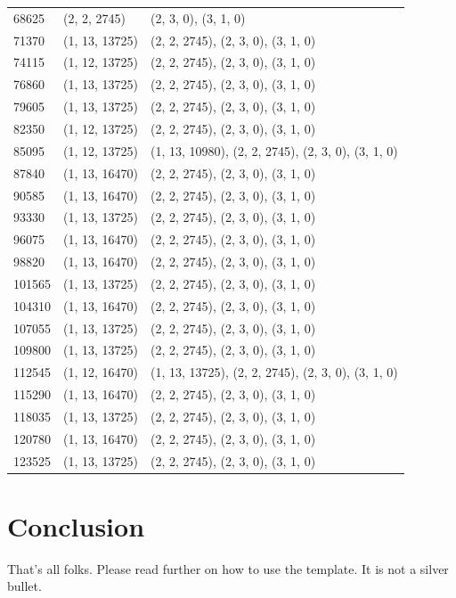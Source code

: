 \documentclass{utmthesis}
\begin{document}
\begin{center}
\begin{longtable}{|l|l|l|}
68625 & (2, 2, 2745) & (2, 3, 0), (3, 1, 0) \\
71370 & (1, 13, 13725) & (2, 2, 2745), (2, 3, 0), (3, 1, 0) \\
74115 & (1, 12, 13725) & (2, 2, 2745), (2, 3, 0), (3, 1, 0) \\
76860 & (1, 13, 13725) & (2, 2, 2745), (2, 3, 0), (3, 1, 0) \\
79605 & (1, 13, 13725) & (2, 2, 2745), (2, 3, 0), (3, 1, 0) \\
82350 & (1, 12, 13725) & (2, 2, 2745), (2, 3, 0), (3, 1, 0) \\
85095 & (1, 12, 13725) & (1, 13, 10980), (2, 2, 2745), (2, 3, 0), (3, 1, 0) \\
87840 & (1, 13, 16470) & (2, 2, 2745), (2, 3, 0), (3, 1, 0) \\
90585 & (1, 13, 16470) & (2, 2, 2745), (2, 3, 0), (3, 1, 0) \\
93330 & (1, 13, 13725) & (2, 2, 2745), (2, 3, 0), (3, 1, 0) \\
96075 & (1, 13, 16470) & (2, 2, 2745), (2, 3, 0), (3, 1, 0) \\
98820 & (1, 13, 16470) & (2, 2, 2745), (2, 3, 0), (3, 1, 0) \\
101565 & (1, 13, 13725) & (2, 2, 2745), (2, 3, 0), (3, 1, 0) \\
104310 & (1, 13, 16470) & (2, 2, 2745), (2, 3, 0), (3, 1, 0) \\
107055 & (1, 13, 13725) & (2, 2, 2745), (2, 3, 0), (3, 1, 0) \\
109800 & (1, 13, 13725) & (2, 2, 2745), (2, 3, 0), (3, 1, 0) \\
112545 & (1, 12, 16470) & (1, 13, 13725), (2, 2, 2745), (2, 3, 0), (3, 1, 0) \\
115290 & (1, 13, 16470) & (2, 2, 2745), (2, 3, 0), (3, 1, 0) \\
118035 & (1, 13, 13725) & (2, 2, 2745), (2, 3, 0), (3, 1, 0) \\
120780 & (1, 13, 16470) & (2, 2, 2745), (2, 3, 0), (3, 1, 0) \\
123525 & (1, 13, 13725) & (2, 2, 2745), (2, 3, 0), (3, 1, 0) \\
\end{longtable}
\end{center}

\chapter{Conclusion}
That's all folks. Please read further on how to use the template. It is not a silver bullet.
\end{document}
